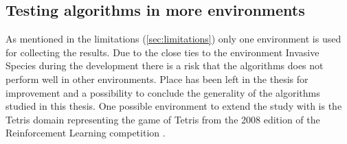 \subsection{Testing algorithms in more environments }
As mentioned in the limitations (\ref{sec:limitations}) only one environment is used for collecting the results. Due to the close ties to the environment Invasive Species during the development there is a risk that the algorithms does not perform well in other environments. Place has been left in the thesis for improvement and a possibility to conclude the generality of the algorithms studied in this thesis. One possible environment to extend the study with is the Tetris domain representing the game of Tetris from the 2008 edition of the Reinforcement Learning competition \parencite{whiteson2010reinforcement}.  
